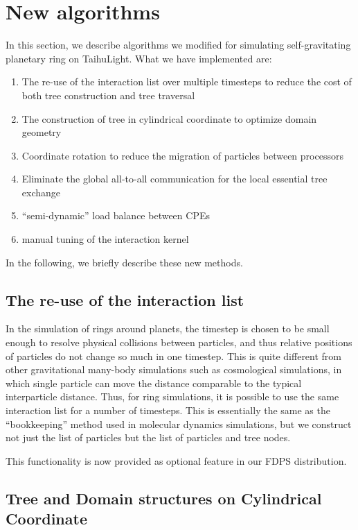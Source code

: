 \documentclass[oribibl]{llncs}
\begin{document}
\section{New algorithms}
\label{sec:impl1}

In this section, we describe algorithms we modified for simulating
self-gravitating planetary ring on TaihuLight. What we have
implemented are:

\begin{enumerate}
\item The re-use of the interaction list over multiple timesteps to
  reduce the cost of both tree construction and tree traversal
\item The construction of tree in cylindrical coordinate to optimize
  domain geometry
\item Coordinate rotation to reduce the migration of particles between
  processors
\item Eliminate the global all-to-all communication for the local
  essential tree exchange
\item ``semi-dynamic'' load balance between CPEs
\item manual tuning of the interaction kernel
\end{enumerate}  

In the following, we briefly describe these new methods.

\subsection{The re-use of the interaction list}
\label{subsec:list}

In the simulation of rings around planets, the timestep is chosen to
be small enough to resolve physical collisions between particles, and
thus relative positions of particles do not change so much in one
timestep. This is quite different from other gravitational many-body
simulations such as cosmological simulations, in which single particle
can move the distance comparable to the typical interparticle
distance. Thus, for ring simulations, it is possible to use the same
interaction list for a number of timesteps. This is essentially the
same as the ``bookkeeping'' method used in molecular dynamics
simulations, but we construct not just the list of particles but the
list of particles and tree nodes.

This functionality is now provided as optional feature in our FDPS
distribution. 

\subsection{Tree and Domain structures on Cylindrical Coordinate}
\label{subsec:cylcoord}
\end{document}
